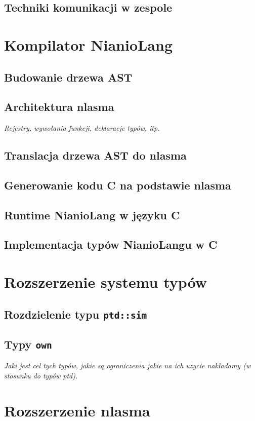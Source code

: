 \documentclass[11pt]{article}
\begin{document}
    \subsection{Techniki komunikacji w zespole}

    \section{Kompilator NianioLang}
    \subsection{Budowanie drzewa AST}
    \subsection{Architektura nlasma}
    \emph{Rejestry, wywołania funkcji, deklaracje typów, itp.}
    \subsection{Translacja drzewa AST do nlasma}
    \subsection{Generowanie kodu C na podstawie nlasma}
    \subsection{Runtime NianioLang w języku C}
    \subsection{Implementacja typów NianioLangu w C}

    \section{Rozszerzenie systemu typów}
    \subsection{Rozdzielenie typu \texttt{ptd::sim}}
    \subsection{Typy \texttt{own}}
    \emph{Jaki jest cel tych typów, jakie są ograniczenia jakie na ich użycie
          nakładamy (w stosunku do typów ptd).}

    \section{Rozszerzenie nlasma}
\end{document}
